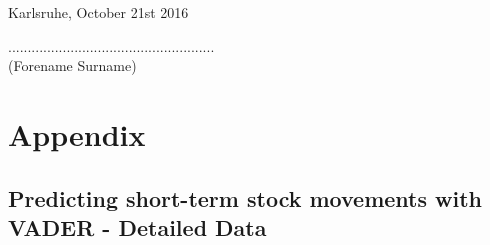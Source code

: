 \documentclass[a4paper,12pt]{article}%
\begin{document}
\begin{flushleft}
    Karlsruhe, October 21st 2016\\[0.1cm]
\end{flushleft}
\hspace*{9.0cm}.....................................................\\
\hspace*{10.1cm}(Forename Surname)

\newpage
{} %
%
%
%
%
\printbibliography


\newpage
{} \nocite{*}
\section*{Appendix}
\setcounter{subsection}{0}
\renewcommand{\thesubsection}{\Roman{subsection}}
\renewcommand{\thesubsubsection}{\Alph{subsubsection}}

\subsection{Predicting short-term stock movements with VADER - Detailed Data \label{vader_appendix}}
\end{document}

